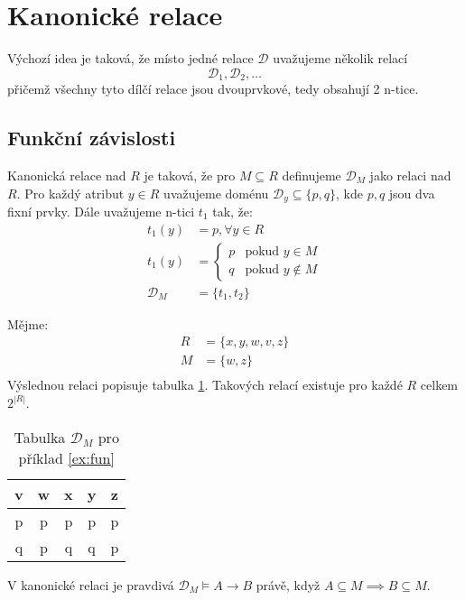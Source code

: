 \section{Kanonické relace}
Výchozí idea je taková, že místo jedné relace $\mathcal{D}$ uvažujeme několik relací
$$
\mathcal{D}_{1},\mathcal{D}_{2},\ldots
$$
přičemž všechny tyto dílčí relace jsou dvouprvkové, tedy obsahují 2 n-tice.

\subsection{Funkční závislosti}
Kanonická relace nad $R$ je taková, že pro $M \subseteq R$ definujeme $\mathcal{D}_{M}$ jako relaci nad $R$. Pro každý atribut $y \in R$ uvažujeme doménu $\mathcal{D}_{y} \subseteq \{ p, q \}$, kde $p, q$ jsou dva fixní prvky. Dále uvažujeme n-tici $t_{1}$ tak, že:
\begin{align*}
t_{1}(y) &= p, \forall y \in R \\
t_{1}(y) &=\left\{\!\!\!
\begin{array}{ll}
p & \text{pokud } y \in M \\
q & \text{pokud } y \notin M
\end{array}\right. \\
\mathcal{D}_{M} &= \{ t_{1}, t_{2} \}
\end{align*}
\begin{upexample}\label{ex:fun}
Mějme:
\begin{align*}
R &= \{ x, y, w, v, z \} \\
M &= \{ w, z \} \\
\end{align*}
Výslednou relaci popisuje tabulka \ref{tab:relfun}. Takových relací existuje pro každé $R$ celkem $2^{|R|}$.
\end{upexample}
\begin{table}
\centering
\caption{Tabulka $\mathcal{D}_{M}$ pro příklad \ref{ex:fun}}\label{tab:relfun}
\begin{tabular}{c c c c c}
v & w & x & y & z \\
\hline
p & p & p & p & p \\
q & p & q & q & p
\end{tabular}
\end{table}
\begin{upquote}
V kanonické relaci je pravdivá $\mathcal{D}_{M} \vDash A \to B$ právě, když $A \subseteq M \implies B \subseteq M$.
\end{upquote}

